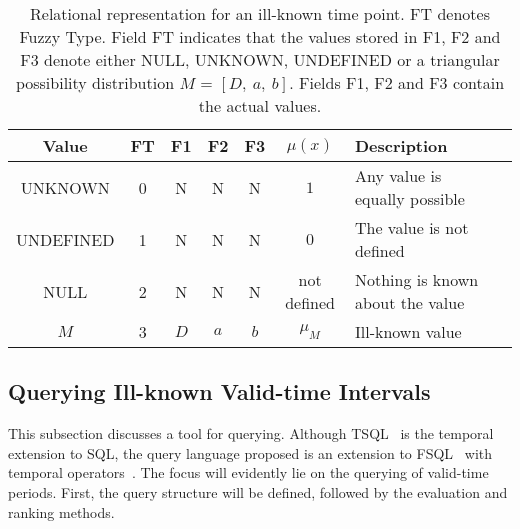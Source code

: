 \vspace{-10pt}

\begin{table}
\centering
\caption{Relational representation for an ill-known time point. FT denotes Fuzzy Type. Field FT indicates that the values stored in F1, F2 and F3 denote either NULL, UNKNOWN, UNDEFINED or a triangular possibility distribution $M$ = $\left[D,\ a,\ b \right]$. Fields F1, F2 and F3 contain the actual values.}%
\begin{tabular}{c c c c c c l p{2cm}}
\hline
Value & FT & F1 & F2 & F3 & $\mu(x)$ & Description \\ \hline
UNKNOWN & 0 & N & N & N  & $1$ & Any value is equally possible\\ 
UNDEFINED & 1 & N & N & N & $0$ & The value is not defined \\%
NULL & 2 & N & N & N &not defined & Nothing is known about the value \\ 
$M$ & 3 & $D$ & $a$ & $b$ & $\mu_{M}$ & Ill-known value \\ 
\hline 
\end{tabular}
\label{table:relational-representation-pvp}

\vspace{10pt}


\end{table}

\vspace{-25pt}

\subsection{Querying Ill-known Valid-time Intervals}
This subsection discusses a tool for querying. Although TSQL~\cite{Jensen1995} is the temporal extension to SQL, the query language proposed is an extension to FSQL~\cite{Gal98} with temporal operators~\cite{Garrido2009}. The focus will evidently lie on the querying of valid-time periods. First, the query structure will be defined, followed by the evaluation and ranking methods.




